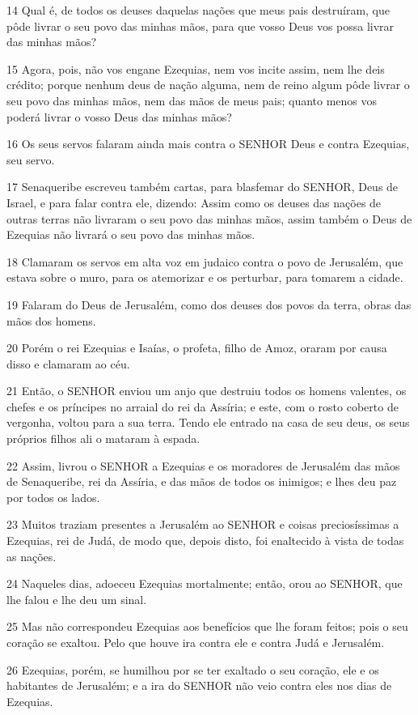 \par 14 Qual é, de todos os deuses daquelas nações que meus pais destruíram, que pôde livrar o seu povo das minhas mãos, para que vosso Deus vos possa livrar das minhas mãos?
\par 15 Agora, pois, não vos engane Ezequias, nem vos incite assim, nem lhe deis crédito; porque nenhum deus de nação alguma, nem de reino algum pôde livrar o seu povo das minhas mãos, nem das mãos de meus pais; quanto menos vos poderá livrar o vosso Deus das minhas mãos?
\par 16 Os seus servos falaram ainda mais contra o SENHOR Deus e contra Ezequias, seu servo.
\par 17 Senaqueribe escreveu também cartas, para blasfemar do SENHOR, Deus de Israel, e para falar contra ele, dizendo: Assim como os deuses das nações de outras terras não livraram o seu povo das minhas mãos, assim também o Deus de Ezequias não livrará o seu povo das minhas mãos.
\par 18 Clamaram os servos em alta voz em judaico contra o povo de Jerusalém, que estava sobre o muro, para os atemorizar e os perturbar, para tomarem a cidade.
\par 19 Falaram do Deus de Jerusalém, como dos deuses dos povos da terra, obras das mãos dos homens.
\par 20 Porém o rei Ezequias e Isaías, o profeta, filho de Amoz, oraram por causa disso e clamaram ao céu.
\par 21 Então, o SENHOR enviou um anjo que destruiu todos os homens valentes, os chefes e os príncipes no arraial do rei da Assíria; e este, com o rosto coberto de vergonha, voltou para a sua terra. Tendo ele entrado na casa de seu deus, os seus próprios filhos ali o mataram à espada.
\par 22 Assim, livrou o SENHOR a Ezequias e os moradores de Jerusalém das mãos de Senaqueribe, rei da Assíria, e das mãos de todos os inimigos; e lhes deu paz por todos os lados.
\par 23 Muitos traziam presentes a Jerusalém ao SENHOR e coisas preciosíssimas a Ezequias, rei de Judá, de modo que, depois disto, foi enaltecido à vista de todas as nações.
\par 24 Naqueles dias, adoeceu Ezequias mortalmente; então, orou ao SENHOR, que lhe falou e lhe deu um sinal.
\par 25 Mas não correspondeu Ezequias aos benefícios que lhe foram feitos; pois o seu coração se exaltou. Pelo que houve ira contra ele e contra Judá e Jerusalém.
\par 26 Ezequias, porém, se humilhou por se ter exaltado o seu coração, ele e os habitantes de Jerusalém; e a ira do SENHOR não veio contra eles nos dias de Ezequias.
